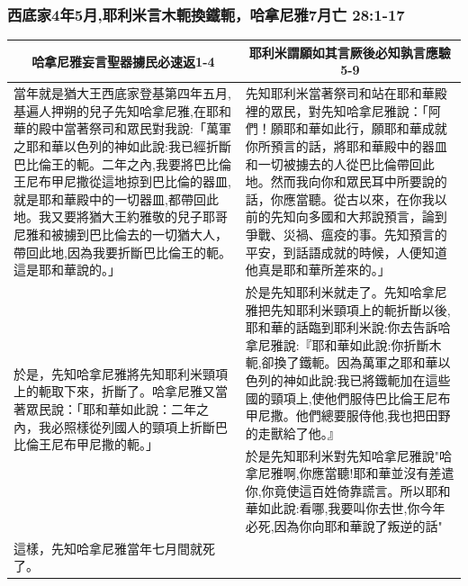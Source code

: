 \subsubsection{西底家4年5月,耶利米言木軛換鐵軛，哈拿尼雅7月亡 28:1-17}
\begin{table}[H]
\centering
\begin{tabular}{p{}|p{9.8cm}}\hline\hline
\multicolumn{1}{c|}{哈拿尼雅妄言聖器擄民必速返1-4}&\multicolumn{1}{c}{耶利米謂願如其言厥後必知孰言應驗5-9}\\\hline
當年就是猶大王西底家登基第四年五月,基遍人押朔的兒子先知哈拿尼雅,在耶和華的殿中當著祭司和眾民對我說:「萬軍之耶和華以色列的神如此說:我已經折斷巴比倫王的軛。二年之內,我要將巴比倫王尼布甲尼撒從這地掠到巴比倫的器皿,就是耶和華殿中的一切器皿,都帶回此地。我又要將猶大王約雅敬的兒子耶哥尼雅和被擄到巴比倫去的一切猶大人，帶回此地,因為我要折斷巴比倫王的軛。這是耶和華說的。」
&先知耶利米當著祭司和站在耶和華殿裡的眾民，對先知哈拿尼雅說：「阿們！願耶和華如此行，願耶和華成就你所預言的話，將耶和華殿中的器皿和一切被擄去的人從巴比倫帶回此地。然而我向你和眾民耳中所要說的話，你應當聽。從古以來，在你我以前的先知向多國和大邦說預言，論到爭戰、災禍、瘟疫的事。先知預言的平安，到話語成就的時候，人便知道他真是耶和華所差來的。」\\\hline

\multirow{2}{8.cm}{於是，先知哈拿尼雅將先知耶利米頸項上的軛取下來，折斷了。哈拿尼雅又當著眾民說：「耶和華如此說：二年之內，我必照樣從列國人的頸項上折斷巴比倫王尼布甲尼撒的軛。」}
&於是先知耶利米就走了。先知哈拿尼雅把先知耶利米頸項上的軛折斷以後,耶和華的話臨到耶利米說:你去告訴哈拿尼雅說:『耶和華如此說:你折斷木軛,卻換了鐵軛。因為萬軍之耶和華以色列的神如此說:我已將鐵軛加在這些國的頸項上,使他們服侍巴比倫王尼布甲尼撒。他們總要服侍他,我也把田野的走獸給了他。』\\\cline{2-2}
&於是先知耶利米對先知哈拿尼雅說"哈拿尼雅啊,你應當聽!耶和華並沒有差遣你,你竟使這百姓倚靠謊言。所以耶和華如此說:看哪,我要叫你去世,你今年必死,因為你向耶和華說了叛逆的話"\\\hline
這樣，先知哈拿尼雅當年七月間就死了。&\\\hline
\end{tabular}
\end{table}

